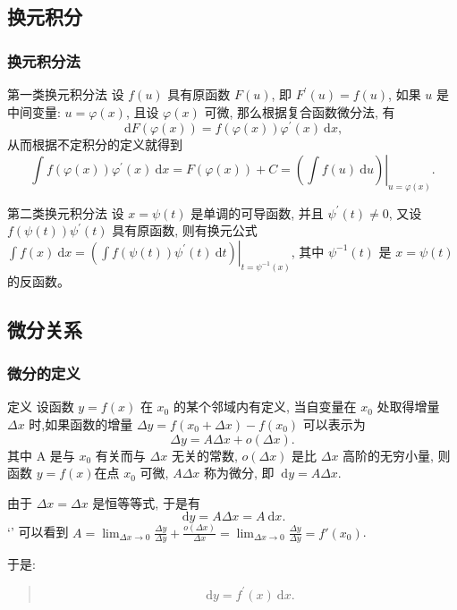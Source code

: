 \documentclass[
10pt,
aspectratio=43,
]{beamer}
\begin{document}
\subsection{换元积分}
\begin{frame}
	\frametitle{换元积分法}
	\everymath{\displaystyle}
	\begin{block}{第一类换元积分法}
		设 $f(u)$ 具有原函数 $F(u)$, 即 $F^{\prime}(u)=f(u)$, 如果 $u$ 是中间变量: $u=\varphi(x)$, 且设 $\varphi(x)$ 可微, 那么根据复合函数微分法, 有
		$$
			\mathrm{~d} F(\varphi(x))=f(\varphi(x)) \varphi^{\prime}(x) \mathrm{~d} x,
		$$ 从而根据不定积分的定义就得到
		$$
			\int f(\varphi(x)) \varphi^{\prime}(x) \mathrm{~d} x=F(\varphi(x))+C=\left.\left(\int f(u) \mathrm{~d} u\right)\right|_{u=\varphi(x)}.
		$$
	\end{block}
	\pause
	\begin{block}{第二类换元积分法}
		设 $x=\psi(t)$ 是单调的可导函数, 并且 $\psi^{\prime}(t) \neq 0$, 又设 $f(\psi(t)) \psi^{\prime}(t)$ 具有原函数, 则有换元公式 $\int f(x) \mathrm{~d} x=\left.\left(\int f(\psi(t)) \psi^{\prime}(t) \mathrm{~d} t\right)\right|_{t=\psi^{-1}(x)}$, 其中 $\psi^{-1}(t)$ 是 $x=\psi(t)$ 的反函数。
	\end{block}
\end{frame}

\subsection{微分关系}
\begin{frame}
	\frametitle{微分的定义}
	\begin{block}{定义}
		设函数 $y=f(x)$ 在 $x_0$ 的某个邻域内有定义, 当自变量在 $x_0$ 处取得增量 $\Delta x$ 时,如果函数的增量 $\Delta y=f\left(x_0+\Delta x\right)-f\left(x_0\right)$ 可以表示为
		$$
			\Delta y=A \Delta x+o(\Delta x).
		$$
		\pause
		其中 $\mathrm{A}$ 是与 $x_0$ 有关而与 $\Delta x$ 无关的常数, $o(\Delta x)$ 是比 $\Delta x$ 高阶的无穷小量, 则函数 $y=f(x)$在点 $x_0$ 可微, $A \Delta x$ 称为微分, 即 $\mathrm{~d} y=A \Delta x$.
		\vspace{0.2cm}
		\pause

		由于 $\Delta x=\Delta x$ 是恒等等式, 于是有
		$$
			\mathrm{~d} y=A \Delta x=A\mathrm{~d}x.
		$$
		\pause`'
		可以看到 $A=\lim_{\Delta x\to0}\frac{\Delta y}{\Delta y}+\frac{o(\Delta x)}{\Delta x} = \lim_{\Delta x\to0}\frac{\Delta y}{\Delta y}=f'(x_0)$.
	\end{block}
	\pause
	于是:
	{\huge
	\begin{quote}
		$$
			\mathrm{d} y=f^{\prime}(x) \mathrm{~d} x.
		$$
	\end{quote}
	}
\end{frame}
\end{document}
